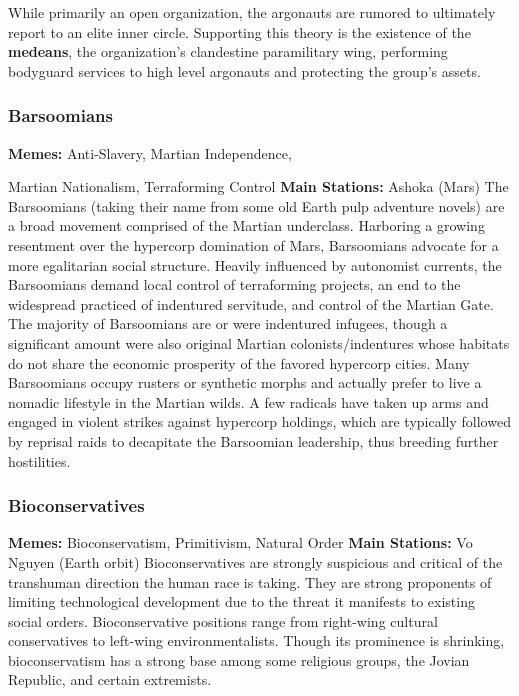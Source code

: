 While primarily an open organization, the argonauts are rumored to ultimately report to an elite 
inner circle. Supporting this theory is the existence 
of the \textbf{medeans}, the organization's clandestine paramilitary wing, performing bodyguard services to high 
level argonauts and protecting the group's assets.

\subsubsection{Barsoomians}

\textbf{Memes:} Anti-Slavery, Martian Independence, 

Martian Nationalism, Terraforming Control
\textbf{Main Stations:} Ashoka (Mars)
The Barsoomians (taking their name from some old 
Earth pulp adventure novels) are a broad movement 
comprised of the Martian underclass. Harboring a 
growing resentment over the hypercorp domination 
of Mars, Barsoomians advocate for a more egalitarian social structure. Heavily influenced by autonomist 
currents, the Barsoomians demand local control 
of terraforming projects, an end to the widespread 
practiced of indentured servitude, and control of the 
Martian Gate. The majority of Barsoomians are or 
were indentured infugees, though a significant amount 
were also original Martian colonists/indentures whose 
habitats do not share the economic prosperity of the 
favored hypercorp cities. Many Barsoomians occupy 
rusters or synthetic morphs and actually prefer to 
live a nomadic lifestyle in the Martian wilds. A few 
radicals have taken up arms and engaged in violent 
strikes against hypercorp holdings, which are typically 
followed by reprisal raids to decapitate the Barsoomian leadership, thus breeding further hostilities.

\subsubsection{Bioconservatives}

\textbf{Memes:} Bioconservatism, Primitivism, Natural Order
\textbf{Main Stations:} Vo Nguyen (Earth orbit)
Bioconservatives are strongly suspicious and critical 
of the transhuman direction the human race is taking. 
They are strong proponents of limiting technological 
development due to the threat it manifests to existing 
social orders. Bioconservative positions range from 
right-wing cultural conservatives to left-wing environmentalists. Though its prominence is shrinking, bioconservatism has a strong base among some religious 
groups, the Jovian Republic, and certain extremists.

